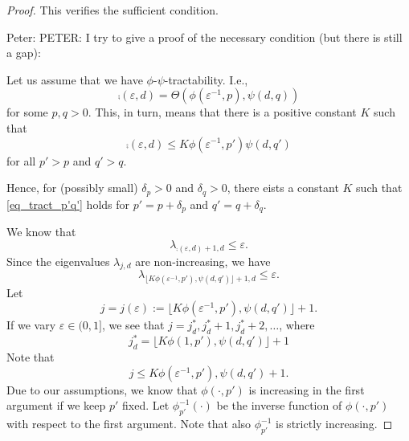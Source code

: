 \documentclass{article}
\theoremstyle{definition}
\newcommand{\peter}[1]{\begingroup\color{purple}Peter: #1\endgroup}
\begin{document}
\begin{proof}
This verifies the sufficient condition.

\peter{PETER: I try to give a proof of the necessary condition (but there is still a gap):



Let us assume that we have $\phi$-$\psi$-tractability. I.e., 
\[
\comp(\varepsilon,d)=\Theta (\phi(\varepsilon^{-1},p),\psi(d,q))
\]
for some $p,q>0$. This, in turn, means that there is a positive constant $K$ such that
\begin{equation}\label{eq_tract_p'q'}
\comp(\varepsilon,d)\le K \phi(\varepsilon^{-1},p')\psi(d,q')
\end{equation}
for all $p'>p$ and $q'>q$. 

Hence, for (possibly small) $\delta_p>0$ and $\delta_q>0$, there eists a constant $K$ such that \eqref{eq_tract_p'q'} holds for $p'=p+\delta_p$ 
and $q'=q+\delta_q$.

We know that
\[
\lambda_{\comp(\varepsilon,d)+1,d}\le \varepsilon.
\]
Since the eigenvalues $\lambda_{j,d}$ are non-increasing, we have
\begin{equation}\label{eq:lambda_K}
\lambda_{\lfloor K \phi(\varepsilon^{-1},p'),\psi(d,q')\rfloor +1,d}\le \varepsilon.
\end{equation}
Let
\[
j=j (\varepsilon):= \lfloor K \phi(\varepsilon^{-1},p'),\psi(d,q')\rfloor +1.
\]
If we vary $\varepsilon\in (0,1]$, we see that $j=j_d^*, j_d^*+1, j_d^*+2,\ldots$, where 
\[
  j_d^*=\lfloor K \phi(1,p'),\psi(d,q')\rfloor +1
\]
Note that
\[
j\le K \phi(\varepsilon^{-1},p'),\psi(d,q') +1.
\]
Due to our assumptions, we know that 
$\phi(\cdot, p')$ is increasing in the first argument if 
we keep $p'$ fixed. Let $\phi_{p'}^{-1} (\cdot)$ be the inverse function of $\phi (\cdot, p')$ with respect to the first argument. Note that also $\phi_{p'}^{-1}$ is strictly increasing. 

}
\end{proof}
\end{document}
